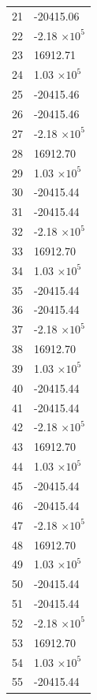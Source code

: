 \documentclass[a4paper,11pt]{article}
\begin{document}
\begin{center}
\begin{longtable}{|R{1.5cm}|R{2.5cm}|}
   21 &    -20415.06 \\
   22 &        -2.18 $\times 10^{           5}$ \\
   23 &     16912.71 \\
   24 &         1.03 $\times 10^{           5}$ \\
   25 &    -20415.46 \\
   26 &    -20415.46 \\
   27 &        -2.18 $\times 10^{           5}$ \\
   28 &     16912.70 \\
   29 &         1.03 $\times 10^{           5}$ \\
   30 &    -20415.44 \\
   31 &    -20415.44 \\
   32 &        -2.18 $\times 10^{           5}$ \\
   33 &     16912.70 \\
   34 &         1.03 $\times 10^{           5}$ \\
   35 &    -20415.44 \\
   36 &    -20415.44 \\
   37 &        -2.18 $\times 10^{           5}$ \\
   38 &     16912.70 \\
   39 &         1.03 $\times 10^{           5}$ \\
   40 &    -20415.44 \\
   41 &    -20415.44 \\
   42 &        -2.18 $\times 10^{           5}$ \\
   43 &     16912.70 \\
   44 &         1.03 $\times 10^{           5}$ \\
   45 &    -20415.44 \\
   46 &    -20415.44 \\
   47 &        -2.18 $\times 10^{           5}$ \\
   48 &     16912.70 \\
   49 &         1.03 $\times 10^{           5}$ \\
   50 &    -20415.44 \\
   51 &    -20415.44 \\
   52 &        -2.18 $\times 10^{           5}$ \\
   53 &     16912.70 \\
   54 &         1.03 $\times 10^{           5}$ \\
   55 &    -20415.44 \\

\end{longtable}
\end{center}
\end{document}
